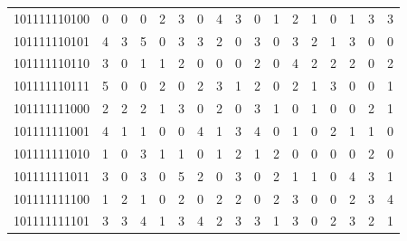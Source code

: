 \documentclass[10pt,a4paper]{article}
\begin{document}
\begin{longtable}{ |c|c|c|c|c|c|c|c|c|c|c|c|c|c|c|c|c| }
    101111110100              & 0                            & 0                                & 0                            & 2                              & 3   & 0   & 4   & 3   & 0   & 1   & 2   & 1   & 0   & 1   & 3   & 3   \\
    101111110101              & 4                            & 3                                & 5                            & 0                              & 3   & 3   & 2   & 0   & 3   & 0   & 3   & 2   & 1   & 3   & 0   & 0   \\
    101111110110              & 3                            & 0                                & 1                            & 1                              & 2   & 0   & 0   & 0   & 2   & 0   & 4   & 2   & 2   & 2   & 0   & 2   \\
    101111110111              & 5                            & 0                                & 0                            & 2                              & 0   & 2   & 3   & 1   & 2   & 0   & 2   & 1   & 3   & 0   & 0   & 1   \\
    101111111000              & 2                            & 2                                & 2                            & 1                              & 3   & 0   & 2   & 0   & 3   & 1   & 0   & 1   & 0   & 0   & 2   & 1   \\
    101111111001              & 4                            & 1                                & 1                            & 0                              & 0   & 4   & 1   & 3   & 4   & 0   & 1   & 0   & 2   & 1   & 1   & 0   \\
    101111111010              & 1                            & 0                                & 3                            & 1                              & 1   & 0   & 1   & 2   & 1   & 2   & 0   & 0   & 0   & 0   & 2   & 0   \\
    101111111011              & 3                            & 0                                & 3                            & 0                              & 5   & 2   & 0   & 3   & 0   & 2   & 1   & 1   & 0   & 4   & 3   & 1   \\
    101111111100              & 1                            & 2                                & 1                            & 0                              & 2   & 0   & 2   & 2   & 0   & 2   & 3   & 0   & 0   & 2   & 3   & 4   \\
    101111111101              & 3                            & 3                                & 4                            & 1                              & 3   & 4   & 2   & 3   & 3   & 1   & 3   & 0   & 2   & 3   & 2   & 1   \\

\end{longtable}
\end{document}
